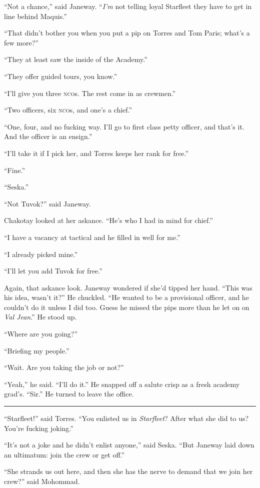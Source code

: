 \documentclass[twoside,letterpaper,12pt]{memoir}
\begin{document}
``Not a chance,'' said Janeway. ``\textit{I’m} not telling loyal Starfleet they have to get in line behind Maquis.'' 

``That didn’t bother you when you put a pip on Torres and Tom Paris; what’s a few more?'' 

``They at least saw the inside of the Academy.'' 

``They offer guided tours, you know.'' 

``I’ll give you three \textsc{nco}s. The rest come in as crewmen.'' 

``Two officers, six \textsc{nco}s, and one’s a chief.'' 

``One, four, and no fucking way. I’ll go to first class petty officer, and that’s it. And the officer is an ensign.'' 

``I’ll take it if I pick her, and Torres keeps her rank for free.'' 

``Fine.'' 

``Seska.'' 

``Not Tuvok?'' said Janeway. 

Chakotay looked at her askance. ``He’s who I had in mind for chief.'' 

``I have a vacancy at tactical and he filled in well for me.'' 

``I already picked mine.'' 

``I’ll let you add Tuvok for free.'' 

Again, that askance look. Janeway wondered if she’d tipped her hand. ``This was his idea, wasn’t it?'' He chuckled. ``He wanted to be a provisional officer, and he couldn’t do it unless I did too. Guess he missed the pips more than he let on on \textit{Val Jean}.'' He stood up. 

``Where are you going?'' 

``Briefing my people.'' 

``Wait. Are you taking the job or not?'' 

``Yeah,'' he said. ``I’ll do it.'' He snapped off a salute crisp as a fresh academy grad’s. ``Sir.'' He turned to leave the office. 

\fancybreak{\rule{3cm}{0.4 pt}} 

``Starfleet!'' said Torres. ``You enlisted us in \textit{Starfleet}? After what she did to us? You’re fucking joking.'' 

``It’s not a joke and he didn’t enlist anyone,'' said Seska. ``But Janeway laid down an ultimatum: join the crew or get off.'' 

``She strands us out here, and then she has the nerve to demand that we join her crew?'' said Mohommad. 
\end{document}
